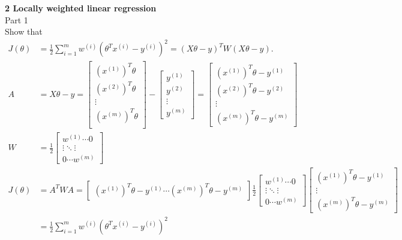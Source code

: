 \documentclass[12pt]{article}
\begin{document}
\noindent \textbf{2 Locally weighted linear regression} \\
	\noindent Part 1 \\
	\indent Show that
	\begin{align*}
	J(\theta) &= \frac{1}{2}  \sum\limits_{i=1}^{m} w^{(i)} (\theta^{T}x^{(i)}-y^{(i)})^2 = (X\theta - y)^{T}W(X\theta -y).
	\\
	A &= X\theta - y = 
		\begin{bmatrix}
			(x^{(1)})^{T}\theta \\
			(x^{(2)})^{T}\theta \\
			\vdots \\
			(x^{(m)})^{T}\theta \\
		\end{bmatrix}
		-
		\begin{bmatrix}
			y^{(1)}\\
			y^{(2)}\\
			\vdots \\
			y^{(m)}
		\end{bmatrix}
		=
		\begin{bmatrix}
			(x^{(1)})^{T}\theta - y^{(1)} \\
			(x^{(2)})^{T}\theta - y^{(2)} \\
			\vdots \\
			(x^{(m)})^{T}\theta - y^{(m)} 
		\end{bmatrix}
	\\
	W &= \frac{1}{2}  
	\begin{bmatrix}
	w^{(1)} \dotsm 0 \\
	\vdots \ddots \vdots  \\
	0 \dotsm w^{(m)}
	\end{bmatrix}
	\\
	J(\theta) &= A^{T}WA = 
		\begin{bmatrix}
		(x^{(1)})^{T}\theta - y^{(1)} \dotsm (x^{(m)})^{T}\theta - y^{(m)}
		\end{bmatrix}
		\frac{1}{2}  
		\begin{bmatrix}
		w^{(1)} \dotsm 0 \\
		\vdots \ddots \vdots  \\
		0 \dotsm w^{(m)}
		\end{bmatrix}
		\begin{bmatrix}
		(x^{(1)})^{T}\theta - y^{(1)} \\
		\vdots\\
		(x^{(m)})^{T}\theta - y^{(m)}
		\end{bmatrix} \\
		&=  \frac{1}{2}\sum\limits_{i=1}^{m} w^{(i)} (\theta^{T}x^{(i)}-y^{(i)})^2
	\end{align*}
	
\end{document}

